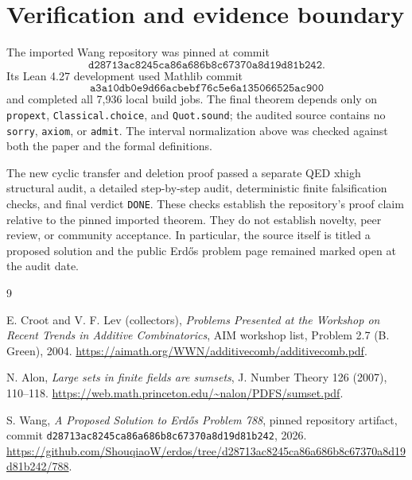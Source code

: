 \documentclass[11pt]{article}
\theoremstyle{definition}
\begin{document}
\appendix

\section{Verification and evidence boundary}\label{sec:evidence}

The imported Wang repository was pinned at commit
\[
\texttt{d28713ac8245ca86a686b8c67370a8d19d81b242}.
\]
Its Lean 4.27 development used Mathlib commit
\[
\texttt{a3a10db0e9d66acbebf76c5e6a135066525ac900}
\]
and completed all 7,936 local build jobs.  The final theorem depends only on
\texttt{propext}, \texttt{Classical.choice}, and \texttt{Quot.sound}; the
audited source contains no \texttt{sorry}, \texttt{axiom}, or \texttt{admit}.
The interval normalization above was checked against both the paper and the
formal definitions.

The new cyclic transfer and deletion proof passed a separate QED xhigh
structural audit, a detailed step-by-step audit, deterministic finite
falsification checks, and final verdict \texttt{DONE}.  These checks establish
the repository's proof claim relative to the pinned imported theorem.  They do
not establish novelty, peer review, or community acceptance.  In particular,
the source itself is titled a proposed solution and the public Erd\H{o}s
problem page remained marked open at the audit date.

\begin{thebibliography}{9}

E. Croot and V. F. Lev (collectors),
\emph{Problems Presented at the Workshop on Recent Trends in Additive
Combinatorics}, AIM workshop list, Problem 2.7 (B. Green), 2004.
\url{https://aimath.org/WWN/additivecomb/additivecomb.pdf}.

N. Alon,
\emph{Large sets in finite fields are sumsets},
J. Number Theory 126 (2007), 110--118.
\url{https://web.math.princeton.edu/~nalon/PDFS/sumset.pdf}.

S. Wang,
\emph{A Proposed Solution to Erd\H{o}s Problem 788},
pinned repository artifact, commit
\texttt{d28713ac8245ca86a686b8c67370a8d19d81b242}, 2026.
\url{https://github.com/ShouqiaoW/erdos/tree/d28713ac8245ca86a686b8c67370a8d19d81b242/788}.

\end{thebibliography}
\end{document}
